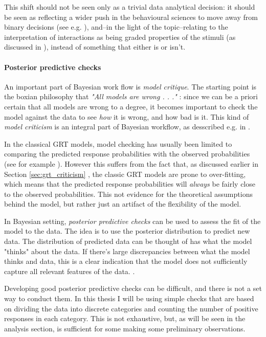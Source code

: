 \documentclass{article}\usepackage{knitr}
\begin{document}
This shift should not be seen only as a trivial data analytical decision: it should be seen as reflecting a wider push in the behavioural sciences to move away from binary decisions (see e.g. \citet{amrhein2017}), and--in the light of the topic--relating to the interpretation of interactions as being graded properties of the stimuli (as discussed in \citet{kemler1993}), instead of something that either is or isn't.

\paragraph{Posterior predictive checks}

An important part of Bayesian work flow is \textit{model critique}. The starting point is the boxian philosophy that \textit{"All models are wrong . . ."} \citep{box2005}: since we can be a priori certain that all models are wrong to a degree, it becomes important to check the model against the data to see \textit{how} it is wrong, and how bad is it. This kind of \textit{model criticism} is an integral part of Bayesian workflow, as desscribed e.g. in \citet[Part II]{bda}.

In the classical GRT models, model checking has usually been limited to comparing the predicted response probabilities with the observed probabilities (see for example \citet[Figure 4]{silbert2009}).  However this suffers from the fact that, as discussed earlier in Section \ref{sec:grt_criticism} \textit{}, the classic GRT models are prone to over-fitting, which means that the predicted response probabilities will \textit{always} be fairly close to the observed probabilities. This not evidence for the theoretical assumptions behind the model, but rather just an artifact of the flexibility of the model.

In Bayesian setting, \textit{posterior predictive checks} can be used to assess the fit of the model to the data. The idea is to use the posterior distribution to predict new data. The distribution of predicted data can be thought of has what the model "thinks" about the data. If there's large discrepancies between what the model thinks and data, this is a clear indication that the model does not sufficiently capture all relevant features of the data. \citep[Chapter 7]{bda}.

Developing good posterior predictive checks can be difficult, and there is not a set way to conduct them. In this thesis I will be using simple checks that are based on dividing the data into discrete categories and counting the number of positive responses in each category. This is not exhaustive, but, as will be seen in the analysis section, is sufficient for some making some preliminary observations. 
\end{document}
